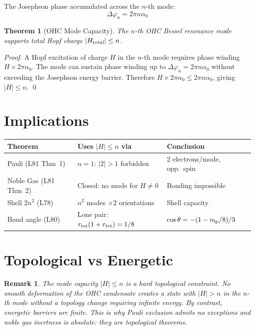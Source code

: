 \documentclass[aps,prl,twocolumn,showpacs,superscriptaddress]{revtex4-2}
\newtheorem{theorem}{Theorem}
\newtheorem{remark}{Remark}
\begin{document}
The Josephson phase accumulated across the $n$-th mode:
\begin{equation}
    \Delta\varphi_n = 2\pi n\alpha_0
\end{equation}

\begin{theorem}[OHC Mode Capacity]
The $n$-th OHC Bessel resonance mode supports total Hopf charge 
$|H_{\rm total}|\leq n$.
\end{theorem}

\begin{proof}
A Hopf excitation of charge $H$ in the $n$-th mode requires phase 
winding $H\times2\pi\alpha_0$. The mode can sustain phase winding up 
to $\Delta\varphi_n = 2\pi n\alpha_0$ without exceeding the Josephson 
energy barrier. Therefore $H\times2\pi\alpha_0 \leq 2\pi n\alpha_0$, 
giving $|H|\leq n$. \qed
\end{proof}

\section{Implications}

\begin{center}
\begin{tabular}{lll}
\toprule
Theorem & Uses $|H|\leq n$ via & Conclusion \\
\midrule
Pauli (L81 Thm~1) & $n=1$: $|2|>1$ forbidden & 2 electrons/mode, opp.~spin \\
Noble Gas (L81 Thm~2) & Closed: no mode for $H\neq0$ & Bonding impossible \\
Shell $2n^2$ (L78) & $n^2$ modes $\times2$ orientations & Shell capacity \\
Bond angle (L80) & Lone pair: $r_{\rm tet}(1+r_{\rm tet})=1/8$ & $\cos\theta=-(1-n_{\rm lp}/8)/3$ \\
\bottomrule
\end{tabular}
\end{center}

\section{Topological vs Energetic}

\begin{remark}
The mode capacity $|H|\leq n$ is a hard topological constraint. 
No smooth deformation of the OHC condensate creates a state with 
$|H|>n$ in the $n$-th mode without a topology change requiring 
infinite energy. By contrast, energetic barriers are finite. 
This is why Pauli exclusion admits no exceptions and noble gas 
inertness is absolute: they are topological theorems.
\end{remark}
\end{document}

